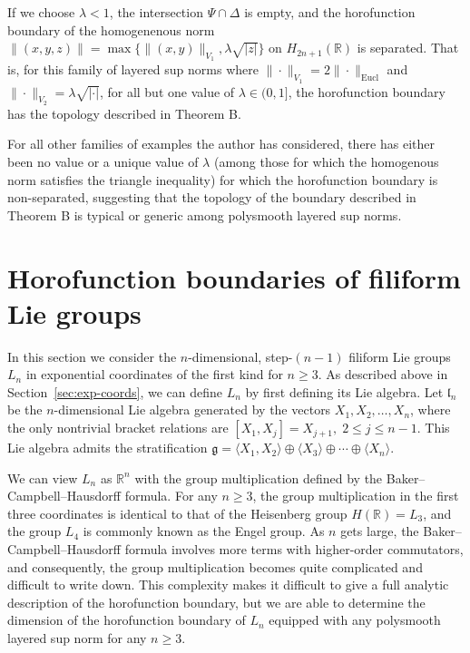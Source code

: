 \documentclass{article}
\theoremstyle{definition}
\newcommand{\norm}[1]{\|#1\|}
\newcommand{\HR}{H(\mathbb{R})}
\newcommand{\HHR}{H_{2n+1}(\mathbb{R})}
\newcommand{\g}{\mathfrak g}
\newcommand{\R}{{\mathbb R}}
\begin{document}
If we choose $\lambda < 1$, the intersection $\Psi \cap \Delta$ is empty, and the horofunction boundary of the homogenenous norm $\norm{(x,y,z)} = \max \{\norm{(x,y)}_{V_1}, \lambda \sqrt{|z|}\}$ on $\HHR$ is separated. That is, for this family of layered sup norms where $\norm{\cdot}_{V_1} = 2\norm{\cdot}_{\text{Eucl}}$ and $\norm{\cdot}_{V_2} = \lambda \sqrt{|\cdot|}$, for all but one value of $\lambda \in (0, 1]$, the horofunction boundary has the topology described in Theorem B.

For all other families of examples the author has considered, there has either been no value or a unique value of $\lambda$ (among those for which the homogenous norm satisfies the triangle inequality) for which the horofunction boundary is non-separated, suggesting that the topology of the boundary described in Theorem B is typical or generic among polysmooth layered sup norms.

\section{Horofunction boundaries of filiform Lie groups}\label{sec:filiform}

In this section we consider the $n$-dimensional, step-$(n-1)$ filiform Lie groups $L_n$ in exponential coordinates of the first kind for $n \geq 3$. As described above in Section~\ref{sec:exp-coords}, we can define $L_n$ by first defining its Lie algebra. Let $\mathfrak{l}_n$ be the $n$-dimensional Lie algebra generated by the vectors $X_1, X_2, \ldots, X_n$, where the only nontrivial bracket relations are
$[X_1,X_j] = X_{j+1}, \; 2\leq j \leq n-1$.
This Lie algebra admits the stratification 
$\g = \langle X_1, X_2\rangle \oplus \langle X_3\rangle \oplus \cdots \oplus \langle X_n\rangle$.

We can view $L_n$ as $\R^n$ with the group multiplication defined by the Baker--Campbell--Hausdorff formula. For any $n \geq 3$, the group multiplication in the first three coordinates is identical to that of the Heisenberg group $\HR = L_3$, and the group $L_4$ is commonly known as the Engel group. As $n$ gets large, the Baker--Campbell--Hausdorff formula involves more terms with higher-order commutators, and consequently, the group multiplication becomes quite complicated and difficult to write down. This complexity makes it difficult to give a full analytic description of the horofunction boundary, but we are able to determine the dimension of the horofunction boundary of $L_n$ equipped with any polysmooth layered sup norm for any $n \geq 3$.
\end{document}
